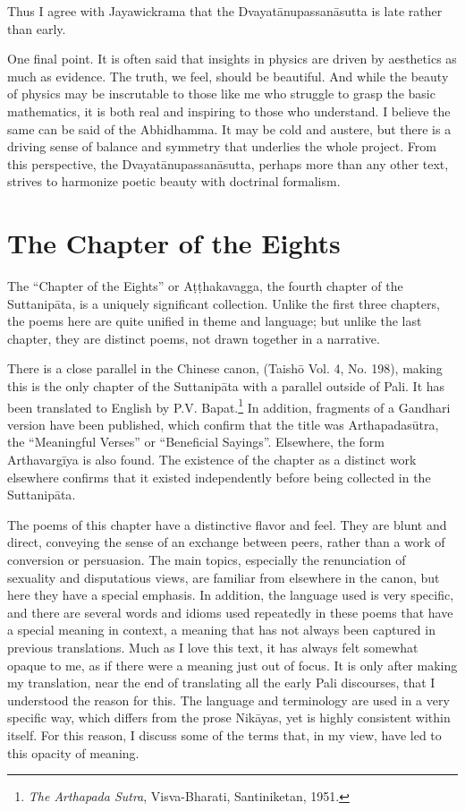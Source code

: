\documentclass[12pt,openany]{book}%
\newcommand*{\langlzh}[1]{\cjk{#1}\normalfont}%
\begin{document}
Thus I agree with Jayawickrama that the \textsanskrit{Dvayatānupassanāsutta} is late rather than early.

One final point. It is often said that insights in physics are driven by aesthetics as much as evidence. The truth, we feel, should be beautiful. And while the beauty of physics may be inscrutable to those like me who struggle to grasp the basic mathematics, it is both real and inspiring to those who understand. I believe the same can be said of the Abhidhamma. It may be cold and austere, but there is a driving sense of balance and symmetry that underlies the whole project. From this perspective, the \textsanskrit{Dvayatānupassanāsutta}, perhaps more than any other text, strives to harmonize poetic beauty with doctrinal formalism.

\section*{The Chapter of the Eights}

The “Chapter of the Eights” or \textsanskrit{Aṭṭhakavagga}, the fourth chapter of the \textsanskrit{Suttanipāta}, is a uniquely significant collection. Unlike the first three chapters, the poems here are quite unified in theme and language; but unlike the last chapter, they are distinct poems, not drawn together in a narrative.

There is a close parallel in the Chinese canon, \langlzh{義足經} (Taishō Vol. 4, No. 198), making this is the only chapter of the \textsanskrit{Suttanipāta} with a parallel outside of Pali. It has been translated to English by P.V. Bapat.\footnote{\textit{The Arthapada Sutra}, Visva-Bharati, Santiniketan, 1951. } In addition, fragments of a Gandhari version have been published, which confirm that the title was \textsanskrit{Arthapadasūtra}, the “Meaningful Verses” or “Beneficial Sayings”. Elsewhere, the form \textsanskrit{Arthavargīya} is also found. The existence of the chapter as a distinct work elsewhere confirms that it existed independently before being collected in the \textsanskrit{Suttanipāta}.

The poems of this chapter have a distinctive flavor and feel. They are blunt and direct, conveying the sense of an exchange between peers, rather than a work of conversion or persuasion. The main topics, especially the renunciation of sexuality and disputatious views, are familiar from elsewhere in the canon, but here they have a special emphasis. In addition, the language used is very specific, and there are several words and idioms used repeatedly in these poems that have a special meaning in context, a meaning that has not always been captured in previous translations. Much as I love this text, it has always felt somewhat opaque to me, as if there were a meaning just out of focus. It is only after making my translation, near the end of translating all the early Pali discourses, that I understood the reason for this. The language and terminology are used in a very specific way, which differs from the prose \textsanskrit{Nikāyas}, yet is highly consistent within itself. For this reason, I discuss some of the terms that, in my view, have led to this opacity of meaning.
\end{document}

